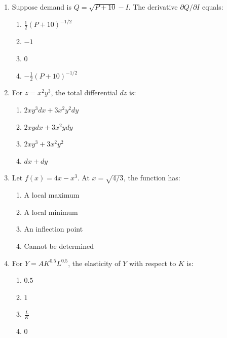 \documentclass[12pt]{article}
\begin{document}
\begin{enumerate}

    \item Suppose demand is \(Q = \sqrt{P+10} - I\). The derivative \(\partial Q/\partial I\) equals:
    \begin{enumerate}
        \item \(\frac{1}{2}(P+10)^{-1/2}\)
        \item \(-1\)
        \item \(0\)
        \item \(-\frac{1}{2}(P+10)^{-1/2}\)
    \end{enumerate}
\vspace{0.7cm}
    \item For \(z = x^2 y^3\), the total differential \(dz\) is:
    \begin{enumerate}
        \item \(2xy^3 dx + 3x^2 y^2 dy\)
        \item \(2xy dx + 3x^2 y dy\)
        \item \(2xy^3 + 3x^2 y^2\)
        \item \(dx + dy\)
    \end{enumerate}
\vspace{0.7cm}
    \item Let \(f(x)=4x - x^3\). At \(x=\sqrt{4/3}\), the function has:
    \begin{enumerate}
        \item A local maximum
        \item A local minimum
        \item An inflection point
        \item Cannot be determined
    \end{enumerate}
\vspace{0.7cm}
    \item For \(Y = A K^{0.5} L^{0.5}\), the elasticity of \(Y\) with respect to \(K\) is:
    \begin{enumerate}
        \item \(0.5\)
        \item \(1\)
        \item \(\frac{L}{K}\)
        \item \(0\)
    \end{enumerate}


\end{enumerate}
\end{document}
